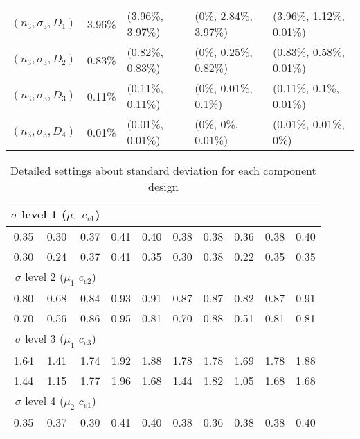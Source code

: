 \documentclass[preprint,12pt]{elsarticle}
\begin{document}
\begin{table}[htbp]
\begin{tabular}{lllll}
       $(n_{3},\sigma_{3},D_{1})$ & 3.96\% & (3.96\%, 3.97\%) & (0\%, 2.84\%, 3.97\%) & (3.96\%, 1.12\%, 0.01\%) \\
       $(n_{3},\sigma_{3},D_{2})$ & 0.83\% & (0.82\%, 0.83\%) & (0\%, 0.25\%, 0.82\%) & (0.83\%, 0.58\%, 0.01\%) \\
   $(n_{3},\sigma_{3},D_{3})$ & 0.11\% & (0.11\%, 0.11\%) & (0\%, 0.01\%, 0.1\%) & (0.11\%, 0.1\%, 0.01\%) \\
     $(n_{3},\sigma_{3},D_{4})$ & 0.01\% & (0.01\%, 0.01\%) & (0\%, 0\%, 0.01\%) & (0.01\%, 0.01\%, 0\%) \\
    \bottomrule
    \end{tabular}%
  \label{tab:lognormaldetail}%
\end{table}%

\begin{table}[htbp]
  \centering
  \caption{Detailed settings about standard deviation for each component design}
    \begin{tabular}{rrrrrrrrrr}
    \toprule
    \multicolumn{3}{c}{$\sigma$ level 1 ($\mu_{1}$ $c_{v1}$)}       &       &       &       &       &       &       &  \\
    \midrule
    0.35  & 0.30  & 0.37  & 0.41  & 0.40  & 0.38  & 0.38  & 0.36  & 0.38  & 0.40 \\
    0.30  & 0.24  & 0.37  & 0.41  & 0.35  & 0.30  & 0.38  & 0.22  & 0.35  & 0.35 \\
    \midrule
    \multicolumn{3}{c}{$\sigma$ level 2 ($\mu_{1}$ $c_{v2}$)}       &       &       &       &       &       &       &  \\
    \midrule
    0.80  & 0.68  & 0.84  & 0.93  & 0.91  & 0.87  & 0.87  & 0.82  & 0.87  & 0.91 \\
    0.70  & 0.56  & 0.86  & 0.95  & 0.81  & 0.70  & 0.88  & 0.51  & 0.81  & 0.81 \\
    \midrule
 \multicolumn{3}{c}{$\sigma$ level 3 ($\mu_{1}$ $c_{v3}$)}       &       &       &       &       &       &       &  \\
    \midrule
    1.64  & 1.41  & 1.74  & 1.92  & 1.88  & 1.78  & 1.78  & 1.69  & 1.78  & 1.88 \\
    1.44  & 1.15  & 1.77  & 1.96  & 1.68  & 1.44  & 1.82  & 1.05  & 1.68  & 1.68 \\
    \midrule
   \multicolumn{3}{c}{$\sigma$ level 4 ($\mu_{2}$ $c_{v1}$)}      &       &       &       &       &       &       &  \\
    \midrule
    0.35  & 0.37  & 0.30  & 0.41  & 0.40  & 0.38  & 0.36  & 0.38  & 0.38  & 0.40 \\

\end{tabular}
\end{table}
\end{document}
